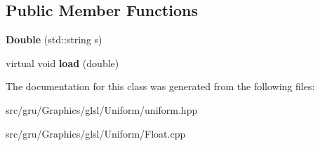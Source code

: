 \subsection*{\-Public \-Member \-Functions}
\begin{DoxyCompactItemize}
\item 
\hypertarget{classglutpp_1_1glsl_1_1Uniform_1_1Scalar_1_1Double_ac99c8217fbc2345785d15f9159b4d972}{{\bfseries \-Double} (std\-::string s)}\label{classglutpp_1_1glsl_1_1Uniform_1_1Scalar_1_1Double_ac99c8217fbc2345785d15f9159b4d972}

\item 
\hypertarget{classglutpp_1_1glsl_1_1Uniform_1_1Scalar_1_1Double_ace7c6e19de12c3d9e495117944b40249}{virtual void {\bfseries load} (double)}\label{classglutpp_1_1glsl_1_1Uniform_1_1Scalar_1_1Double_ace7c6e19de12c3d9e495117944b40249}

\end{DoxyCompactItemize}


\-The documentation for this class was generated from the following files\-:\begin{DoxyCompactItemize}
\item 
src/gru/\-Graphics/glsl/\-Uniform/uniform.\-hpp\item 
src/gru/\-Graphics/glsl/\-Uniform/\-Float.\-cpp\end{DoxyCompactItemize}

